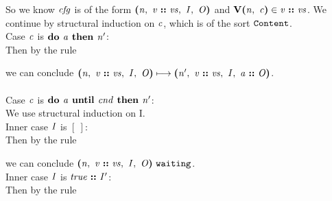 \documentclass[12pt]{article}
\begin{document}
So we know $\nterm{cfg}$ is of the form
$\cfg{\nterm{n}}{\cons{\nterm{v}}{\nterm{vs}}}{\nterm{I}}{\nterm{O}}$ and
$\ver{\nterm{n}}{\nterm{c}} \in \cons{\nterm{v}}{\nterm{vs}}$. We continue by
  structural induction on $\nterm{c}$, which is of the sort $\sort{Content}$.\\

Case $\nterm{c}$ is $\doonce{\nterm{a}}{\nterm{n'}}$:\\

Then by the rule

\begin{mathpar}
\end{mathpar}

we can conclude
$\steps{
   \cfg{\nterm{n}}{\cons{\nterm{v}}{\nterm{vs}}}{\nterm{I}}{\nterm{O}}
 }{
   \cfg{\nterm{n'}}{\cons{\nterm{v}}{\nterm{vs}}}{\nterm{I}}{\cons{\nterm{a}}{\nterm{O}}}
 }$.\\
\\

Case $\nterm{c}$ is $\dountil{\nterm{a}}{\nterm{cnd}}{\nterm{n'}}$:\\

We use structural induction on I.\\

Inner case $\nterm{I}$ is $[\ ]$:\\

Then by the rule

\begin{mathpar}
\end{mathpar}

we can conclude
$\waiting{\cfg{\nterm{n}}{\cons{\nterm{v}}{\nterm{vs}}}{\nterm{I}}{\nterm{O}}}$.\\

Inner case $\nterm{I}$ is $\cons{\nterm{true}}{\nterm{I'}}$:\\

Then by the rule

\begin{mathpar}
\end{mathpar}
\end{document}
